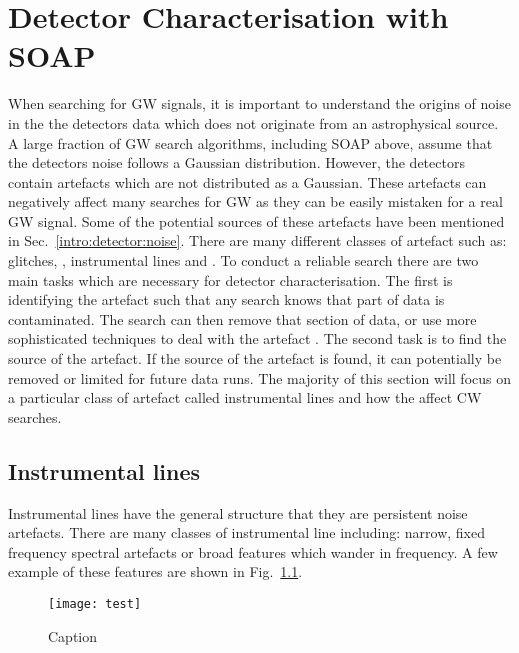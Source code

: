 \chapter{\label{detchar}Detector Characterisation with SOAP}

When searching for \ac{GW} signals, it is important to understand the origins of noise in the the detectors data which does not originate from an astrophysical source.
A large fraction of \ac{GW} search algorithms, including SOAP above, assume that the detectors noise follows a Gaussian distribution.
However, the detectors contain artefacts which are not distributed as a Gaussian. 
These artefacts can negatively affect many searches for \ac{GW} as they can be easily mistaken for a real \ac{GW} signal.
Some of the potential sources of these artefacts have been mentioned in Sec.~\ref{intro:detector:noise}. 
There are many different classes of artefact such as: glitches, , instrumental lines and .
To conduct a reliable search there are two main tasks which are necessary for detector characterisation.
The first is identifying the artefact such that any search knows that part of data is contaminated.
The search can then remove that section of data, or use more sophisticated techniques to deal with the artefact \citep{}.
The second task is to find the source of the artefact. 
If the source of the artefact is found, it can potentially be removed or limited for future data runs.
The majority of this section will focus on a particular class of artefact called instrumental lines and how the affect \ac{CW} searches.





\section{Instrumental lines}

Instrumental lines have the general structure that they are persistent noise artefacts.
There are many classes of instrumental line including: narrow, fixed frequency spectral artefacts or broad features which wander in frequency.
A few example of these features are shown in Fig.~\ref{}. 

\begin{figure}
    \centering
    \texttt{[image: test]}
    \caption{Caption}
    \label{fig:my_label}
\end{figure}

